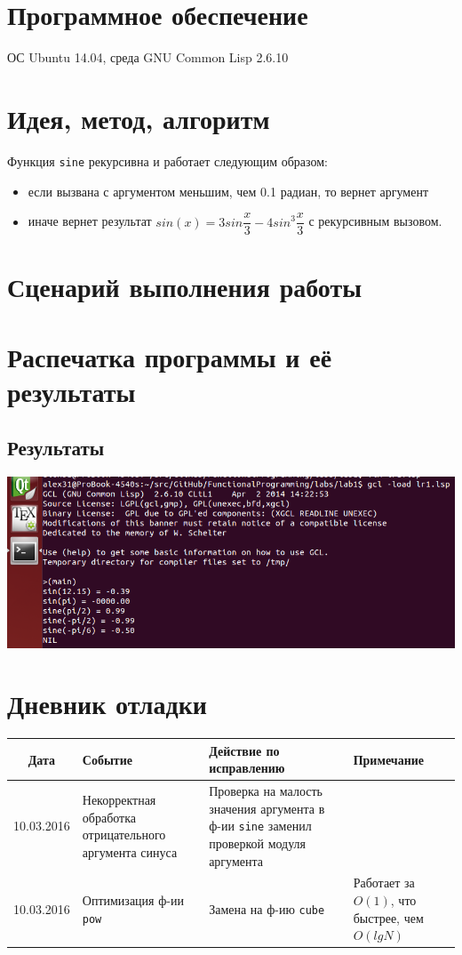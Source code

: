 \documentclass[12pt]{article}
\begin{document}
\section{Программное обеспечение}
ОС Ubuntu 14.04, среда GNU Common Lisp 2.6.10

\section{Идея, метод, алгоритм}
Функция {\color{red}\tt{sine}} рекурсивна и работает следующим образом:
\begin{itemize}
\setlength{\itemsep}{-1mm} %
\item если вызвана с аргументом меньшим, чем 0.1 радиан, то вернет аргумент
\item иначе вернет результат $sin(x) = 3sin\dfrac{x}{3} - 4sin^3\dfrac{x}{3}$ с рекурсивным вызовом.
\end{itemize}

\section{Сценарий выполнения работы}
\section{Распечатка программы и её результаты}

\subsection{Результаты}
\includegraphics[scale=0.7]{lr1Screen}

%

\section{Дневник отладки}
\begin{tabular}{|c|p{5cm}|p{5cm}|p{3cm}|}
\hline
Дата & Событие & Действие по исправлению & Примечание \\
\hline
10.03.2016 & 
Некорректная обработка
отрицательного аргумента синуса & 
Проверка на малость значения
аргумента в ф-ии {\color{red}\tt{sine}} заменил 
проверкой модуля аргумента & \\ 
\hline 
10.03.2016 & Оптимизация ф-ии {\color{red}\tt{pow}} & Замена на ф-ию 
{\color{red}\tt{cube}} & Работает за $O(1)$, что быстрее, 
чем $O(lg{N})$ \\ 
\hline
\end{tabular}
\end{document}
